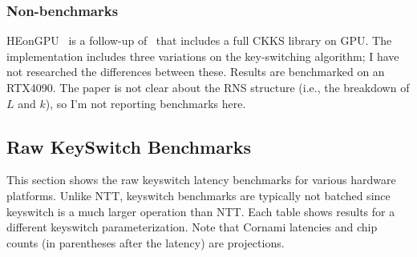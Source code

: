 \documentclass{article}
\begin{document}
	\subsubsection{Non-benchmarks}
	HEonGPU~\cite{cryptoeprint:2024/1543} is a follow-up of~\cite{cryptoeprint:2023/1410} that includes a full CKKS library on GPU. The implementation includes three variations on the key-switching algorithm; I have not researched the differences between these. Results are benchmarked on an RTX4090. The paper is not clear about the RNS structure (i.e., the breakdown of $L$ and $k$), so I'm not reporting benchmarks here.
	
	\subsection{Raw KeySwitch Benchmarks}
	This section shows the raw keyswitch latency benchmarks for various hardware platforms. 
	Unlike NTT, keyswitch benchmarks are typically not batched since keyswitch is a much larger operation than NTT. 
	Each table shows results for a different keyswitch parameterization. Note that Cornami latencies and chip counts (in parentheses after the latency) are projections.
	
\end{document}
